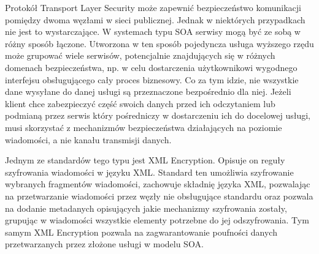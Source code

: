 Protokół Transport Layer Security może zapewnić bezpieczeństwo komunikacji pomiędzy dwoma węzłami w sieci publicznej. Jednak w niektórych przypadkach nie jest to wystarczające. W systemach typu SOA serwisy mogą być ze sobą w różny sposób łączone. Utworzona w ten sposób pojedyncza usługa wyższego rzędu może grupować wiele serwisów, potencjalnie znajdujących się w różnych domenach bezpieczeństwa, np. w celu dostarczenia użytkownikowi wygodnego interfejsu obsługującego cały proces biznesowy. Co za tym idzie, nie wszystkie dane wysyłane do danej usługi są przeznaczone bezpośrednio dla niej. Jeżeli klient chce zabezpieczyć część swoich danych przed ich odczytaniem lub podmianą przez serwis który pośredniczy w dostarczeniu ich do docelowej usługi, musi skorzystać z mechanizmów bezpieczeństwa działających na poziomie wiadomości, a nie kanału transmisji danych.

Jednym ze standardów tego typu jest XML Encryption. Opisuje on reguły szyfrowania wiadomości w języku XML. Standard ten umożliwia szyfrowanie wybranych fragmentów wiadomości, zachowuje składnię języka XML, pozwalając na przetwarzanie wiadomości przez węzły nie obsługujące standardu oraz pozwala na dodanie metadanych opisujących jakie mechanizmy szyfrowania zostały, grupując w wiadomości wszystkie elementy potrzebne do jej odszyfrowania.\cite{kanneganti2008soa}
Tym samym XML Encryption pozwala na zagwarantowanie poufności danych przetwarzanych przez złożone usługi w modelu SOA.


